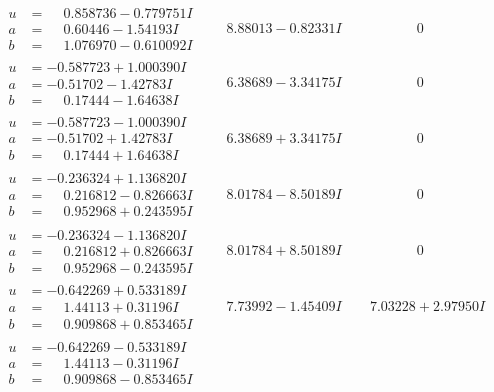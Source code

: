 \documentclass[1p]{elsarticle_modified}
\theoremstyle{definition}
\begin{document}
$$\begin{array}{c|c|c}
\begin{aligned}
u &= \phantom{-}0.858736 - 0.779751 I \\
a &= \phantom{-}0.60446 - 1.54193 I \\
b &= \phantom{-}1.076970 - 0.610092 I\end{aligned}
 & \phantom{-}8.88013 - 0.82331 I & \phantom{-0.000000 } 0 \\ \hline\begin{aligned}
u &= -0.587723 + 1.000390 I \\
a &= -0.51702 - 1.42783 I \\
b &= \phantom{-}0.17444 - 1.64638 I\end{aligned}
 & \phantom{-}6.38689 - 3.34175 I & \phantom{-0.000000 } 0 \\ \hline\begin{aligned}
u &= -0.587723 - 1.000390 I \\
a &= -0.51702 + 1.42783 I \\
b &= \phantom{-}0.17444 + 1.64638 I\end{aligned}
 & \phantom{-}6.38689 + 3.34175 I & \phantom{-0.000000 } 0 \\ \hline\begin{aligned}
u &= -0.236324 + 1.136820 I \\
a &= \phantom{-}0.216812 - 0.826663 I \\
b &= \phantom{-}0.952968 + 0.243595 I\end{aligned}
 & \phantom{-}8.01784 - 8.50189 I & \phantom{-0.000000 } 0 \\ \hline\begin{aligned}
u &= -0.236324 - 1.136820 I \\
a &= \phantom{-}0.216812 + 0.826663 I \\
b &= \phantom{-}0.952968 - 0.243595 I\end{aligned}
 & \phantom{-}8.01784 + 8.50189 I & \phantom{-0.000000 } 0 \\ \hline\begin{aligned}
u &= -0.642269 + 0.533189 I \\
a &= \phantom{-}1.44113 + 0.31196 I \\
b &= \phantom{-}0.909868 + 0.853465 I\end{aligned}
 & \phantom{-}7.73992 - 1.45409 I & \phantom{-}7.03228 + 2.97950 I \\ \hline\begin{aligned}
u &= -0.642269 - 0.533189 I \\
a &= \phantom{-}1.44113 - 0.31196 I \\
b &= \phantom{-}0.909868 - 0.853465 I\end{aligned}

\end{array}$$
\end{document}

